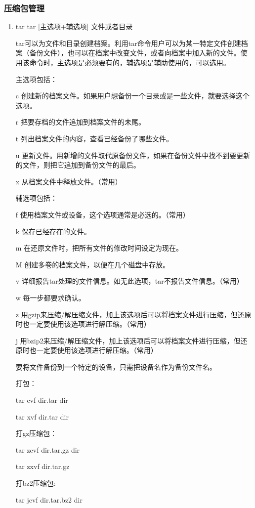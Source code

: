 \documentclass[11pt]{article}
\begin{document}
\subsubsection{压缩包管理}
\label{sec-1-1-7}
\begin{enumerate}
\item tar
\label{sec-1-1-7-1}
tar [主选项+辅选项] 文件或者目录

tar可以为文件和目录创建档案。利用tar命令用户可以为某一特定文件创建档案（备份文件），也可以在档案中改变文件，或者向档案中加入新的文件。使用该命令时，主选项是必须要有的，辅选项是辅助使用的，可以选用。 

主选项包括： 

c 创建新的档案文件。如果用户想备份一个目录或是一些文件，就要选择这个选项。 

r 把要存档的文件追加到档案文件的未尾。 

t 列出档案文件的内容，查看已经备份了哪些文件。 

u 更新文件。用新增的文件取代原备份文件，如果在备份文件中找不到要更新的文件，则把它追加到备份文件的最后。 

x 从档案文件中释放文件。（常用） 

辅选项包括： 

f 使用档案文件或设备，这个选项通常是必选的。（常用） 

k 保存已经存在的文件。 

m 在还原文件时，把所有文件的修改时间设定为现在。 

M 创建多卷的档案文件，以便在几个磁盘中存放。 

v 详细报告tar处理的文件信息。如无此选项，tar不报告文件信息。（常用） 

w 每一步都要求确认。 

z 用gzip来压缩/解压缩文件，加上该选项后可以将档案文件进行压缩，但还原时也一定要使用该选项进行解压缩。（常用） 

j 用bzip2来压缩/解压缩文件，加上该选项后可以将档案文件进行压缩，但还原时也一定要使用该选项进行解压缩。（常用） 

要将文件备份到一个特定的设备，只需把设备名作为备份文件名。 

打包：

tar cvf dir.tar dir

tar xvf dir.tar dir

打gz压缩包：

tar zcvf dir.tar.gz dir

tar zxvf dir.tar.gz 

打bz2压缩包:

tar jcvf dir.tar.bz2 dir


\end{enumerate}
\end{document}
